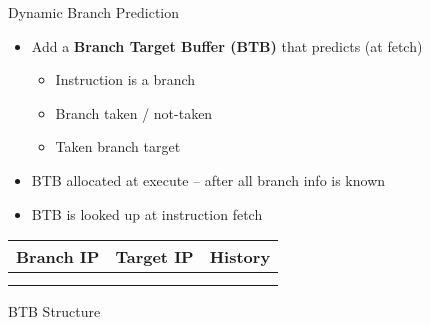 \documentclass[aspectratio=169,12pt]{beamer}
\begin{document}
\begin{frame}{Dynamic Branch Prediction}
    \begin{itemize}
        \item Add a \textbf{Branch Target Buffer (BTB)} that predicts (at fetch)
        \begin{itemize}
            \item Instruction is a branch
            \item Branch taken / not-taken
            \item Taken branch target
        \end{itemize}
        \item BTB allocated at execute – after all branch info is known
        \item BTB is looked up at instruction fetch
    \end{itemize}
    
    \centering
    \begin{tabular}{|c|c|c|}
        \hline
        Branch IP & Target IP & History\\
        \hline
        & & \\
        & & \\
        \hline
    \end{tabular}
    
    \vspace{0.5cm}
    BTB Structure
\end{frame}
\end{document}
